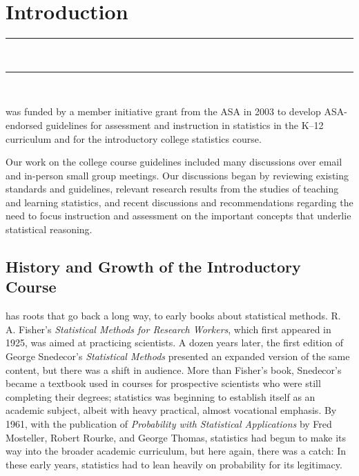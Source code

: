 \documentclass[twoside,openany]{tufte-book}
\newcommand{\blankpage}{\newpage\hbox{}\thispagestyle{empty}\newpage}
\begin{document}
\mainmatter
\blankpage

\chapter{Introduction}
\vspace{-.53in}
   \noindent\color{graylight}\rule[0cm]{3.25in}{0.03cm} \\
    \noindent\color{graylight}\rule[0.4cm]{3.25in}{0.03cm} \\
\color{black}
\vspace{.05in}

 was funded by a member initiative grant from the ASA in 2003 to develop ASA-endorsed guidelines for assessment and instruction in statistics in the K--12 curriculum and for the introductory college statistics course.   

Our work on the college course guidelines included many discussions over email and in-person small group meetings.  Our discussions began by reviewing existing standards and guidelines, relevant research results from the studies of teaching and learning statistics, and recent discussions and recommendations regarding the need to focus instruction and assessment on the important concepts that underlie statistical reasoning.

\section{\textbf{History and Growth of the Introductory Course}}
 has roots that go back a long way, to early books about statistical methods.  R. A. Fisher's \textit{Statistical Methods for Research Workers}, which first appeared in 1925, was aimed at practicing scientists.  A dozen years later, the first edition of George Snedecor's \textit{Statistical Methods} presented an expanded version of the same content, but there was a shift in audience.  More than Fisher's book, Snedecor's became a textbook used in courses for prospective scientists who were still completing their degrees; statistics was beginning to establish itself as an academic subject, albeit with heavy practical, almost vocational emphasis.  By 1961, with the publication of \textit{Probability with Statistical Applications} by Fred Mosteller, Robert Rourke, and George Thomas, statistics had begun to make its way into the broader academic curriculum, but here again, there was a catch: In these early years, statistics had to lean heavily on probability for its legitimacy.  
\end{document}
